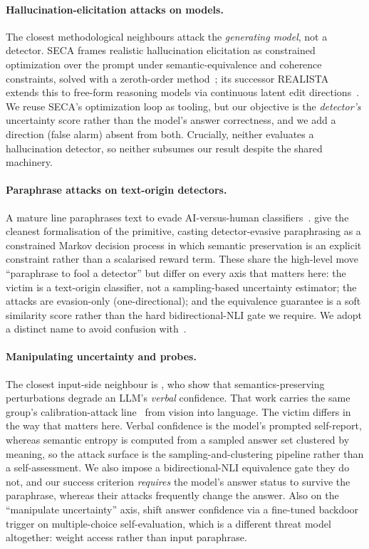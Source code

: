 \paragraph{Hallucination-elicitation attacks on models.}
The closest methodological neighbours attack the \emph{generating model}, not a
detector. SECA frames realistic hallucination elicitation as constrained
optimization over the prompt under semantic-equivalence and coherence
constraints, solved with a zeroth-order method~\citep{liang2025seca}; its
successor REALISTA extends this to free-form reasoning models via continuous
latent edit directions~\citep{liang2026realista}. We reuse SECA's optimization
loop as tooling, but our objective is the \emph{detector's} uncertainty score
rather than the model's answer correctness, and we add a direction (false alarm)
absent from both. Crucially, neither evaluates a hallucination detector, so
neither subsumes our result despite the shared machinery.

\paragraph{Paraphrase attacks on text-origin detectors.}
A mature line paraphrases text to evade AI-versus-human
classifiers~\citep{cheng2025advparaphrasing,fang2025copa}. \citet{wang2026depo} give the
cleanest formalisation of the primitive, casting detector-evasive paraphrasing as a
constrained Markov decision process in which semantic preservation is an explicit
constraint rather than a scalarised reward term. These share the
high-level move ``paraphrase to fool a detector'' but differ on every axis that
matters here: the victim is a text-origin classifier, not a sampling-based
uncertainty estimator; the attacks are evasion-only (one-directional); and the
equivalence guarantee is a soft similarity score rather than the hard
bidirectional-NLI gate we require. We adopt a distinct name to avoid confusion
with~\citet{cheng2025advparaphrasing}.

\paragraph{Manipulating uncertainty and probes.}
The closest input-side neighbour is \citet{obadinma2025verbal}, who show that
semantics-preserving perturbations degrade an LLM's \emph{verbal} confidence. That work
carries the same group's calibration-attack line~\citep{obadinma2024calibration} from vision
into language. The victim differs in the way that matters here. Verbal confidence is the
model's prompted self-report, whereas semantic entropy is computed from a sampled answer set
clustered by meaning, so the attack surface is the sampling-and-clustering pipeline rather
than a self-assessment. We also impose a bidirectional-NLI equivalence gate they do not, and
our success criterion \emph{requires} the model's answer status to survive the paraphrase,
whereas their attacks frequently change the answer. Also on the ``manipulate uncertainty''
axis, \citet{uncertaintyfragile2024}
shift answer confidence via a fine-tuned backdoor trigger on multiple-choice
self-evaluation, which is a different threat model altogether: weight access rather than
input paraphrase.

